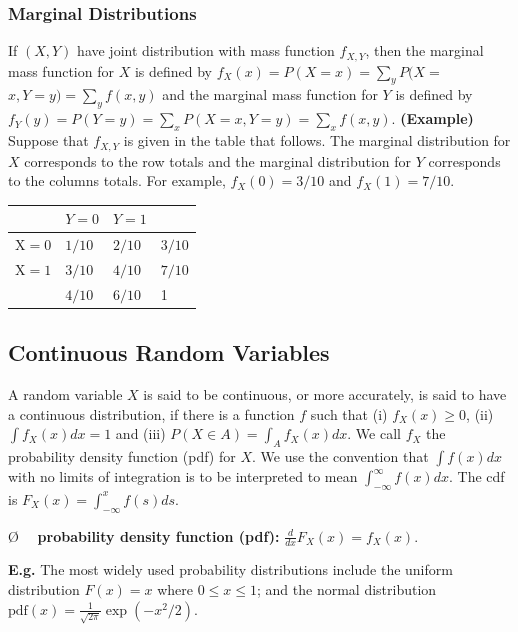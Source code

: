 \documentclass[13pt]{article}
\theoremstyle{definition}
\theoremstyle{remark}
\newenvironment{remark}
  {\pushQED{\qed}\renewcommand{\qedsymbol}{$\triangle$}\remarkx}
  {\popQED\endremarkx}
\newenvironment{point}
  {\O~~}
  {}
\begin{document}
\subsubsection{Marginal Distributions}
If $(X, Y)$ have joint distribution with mass function $f_{X, Y}$, then the marginal mass function for $X$ is defined by $f_{X}(x)=P(X=x)=\sum_{y} P(X=$ $x, Y=y)=\sum_{y} f(x, y)$ and the marginal mass function for $Y$ is defined by $f_{Y}(y)=P(Y=y)=\sum_{x} P(X=x, Y=y)=\sum_{x} f(x, y)$.
\begin{remark}
    \textbf{(Example)} Suppose that $f_{X, Y}$ is given in the table that follows. The marginal distribution for $X$ corresponds to the row totals and the marginal distribution for $Y$ corresponds to the columns totals. For example, $f_{X}(0)=3 / 10$ and $f_{X}(1)=7 / 10$.

\begin{center}
\begin{tabular}{l|ll|l}
 & $Y=0$ & $Y=1$ &  \\
\hline
$\mathrm{X}=0$ & $1 / 10$ & $2 / 10$ & $3 / 10$ \\
$\mathrm{X}=1$ & $3 / 10$ & $4 / 10$ & $7 / 10$ \\
\hline
 & $4 / 10$ & $6 / 10$ & 1 \\
\hline
\end{tabular}
\end{center}
\end{remark}

\subsection{Continuous Random Variables}

A random variable $X$ is said to be continuous, or more accurately, is said to have a continuous distribution, if there is a function $f$ such that (i) $f_{X}(x) \geq 0$, (ii) $\int f_{X}(x) d x=1$ and (iii) $P(X \in A)=\int_{A} f_{X}(x) d x$. We call $f_{X}$ the probability density function (pdf) for $X$. We use the convention that $\int f(x) d x$ with no limits of integration is to be interpreted to mean $\int_{-\infty}^{\infty} f(x) d x$. The cdf is $F_{X}(x)=\int_{-\infty}^{x} f(s) d s$. 

\begin{point}
    \textbf{probability density function (pdf):} $\frac{d}{dx}F_X(x)=f_X(x)$.

    \textbf{E.g.} The most widely used probability distributions include the uniform distribution $F(x)=x$ where $0\leq x\leq 1$; and the normal distribution $\text{pdf}(x)=\frac{1}{\sqrt{2\pi}}\exp(-x^2/2)$.
\end{point} 
\end{document}
